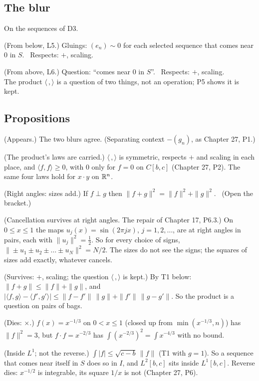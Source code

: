 \subsection*{The blur}

On the sequences of D3.

\begin{lines}
\item[\lab{B1}] (From below, L5.) Gluings: $(e_n) \sim 0$ for each selected sequence that comes near $0$ in $S$. \ Respects: $+$, scaling.
\item[\lab{B2}] (From above, L6.) Question: ``comes near $0$ in $S$''. \ Respects: $+$, scaling. \\
The product $\langle\,,\rangle$ is a question of two things, not an operation; P5 shows it is kept.
\end{lines}

\subsection*{Propositions}

\begin{lines}
\item[\lab{P1}] (Appears.) The two blurs agree. (Separating context $-(g_n)$, as Chapter 27, P1.)
\item[\lab{P2}] (The product's laws are carried.) $\langle\,,\rangle$ is symmetric, respects $+$ and scaling in each place, and $\langle f, f \rangle \ge 0$, with $0$ only for $f = 0$ on $C[b,c]$ (Chapter 27, P2). The same four laws hold for $x \cdot y$ on $\mathbb{R}^n$.
\item[\lab{P3}] (Right angles: sizes add.) If $f \perp g$ then $\|f + g\|^2 = \|f\|^2 + \|g\|^2$. \ (Open the bracket.)
\item[\lab{P4}] (Cancellation survives at right angles. The repair of Chapter 17, P6.3.) On $0 \le x \le 1$ the maps $u_j(x) = \sin(2\pi j x)$, $j = 1, 2, \dots$, are at right angles in pairs, each with $\|u_j\|^2 = \tfrac12$. So for every choice of signs, $\|\pm u_1 \pm u_2 \pm \dots \pm u_N\|^2 = N/2$. The sizes do not see the signs; the squares of sizes add exactly, whatever cancels.
\item[\lab{P5}] (Survives: $+$, scaling; the question $\langle\,,\rangle$ is kept.) By T1 below: $\|f + g\| \le \|f\| + \|g\|$, and $|\langle f, g \rangle - \langle f', g' \rangle| \le \|f - f'\|\,\|g\| + \|f'\|\,\|g - g'\|$. So the product is a question on pairs of bags.
\item[\lab{P6}] (Dies: $\times$.) $f(x) = x^{-1/3}$ on $0 < x \le 1$ (closed up from $\min(x^{-1/3}, n)$) has $\|f\|^2 = 3$, but $f \cdot f = x^{-2/3}$ has $\int (x^{-2/3})^2 = \int x^{-4/3}$ with no bound.
\item[\lab{P7}] (Inside $L^1$; not the reverse.) $\int |f| \le \sqrt{c - b}\,\|f\|$ (T1 with $g = 1$). So a sequence that comes near itself in $S$ does so in $I$, and $L^2[b,c]$ sits inside $L^1[b,c]$. Reverse dies: $x^{-1/2}$ is integrable, its square $1/x$ is not (Chapter 27, P6).
\end{lines}

